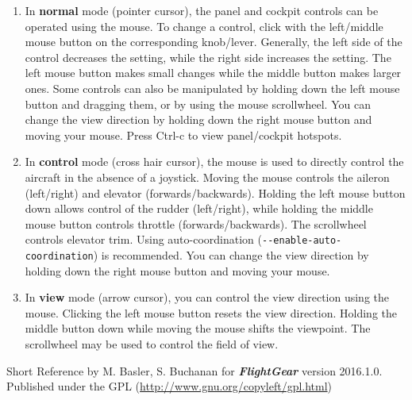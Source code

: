 \documentclass[10pt]{article}
\newcommand{\FlightGear}{{\itshape\bfseries FlightGear}}
\newcommand{\web}[1]{\href{#1}{#1}}
\begin{document}
 \begin{enumerate}
 \item In \textbf{normal} mode (pointer cursor), the panel and cockpit controls can be
 operated using the mouse. To change a control, click with the left/middle mouse button
 on the corresponding knob/lever. Generally, the left side of the control decreases the setting,
 while the right side increases the setting. The left mouse button makes small changes while the
 middle button makes larger ones. Some controls can also be manipulated by holding down the left
 mouse button and dragging them, or by using the mouse scrollwheel. You can change the view
 direction by holding down the right mouse button and moving your mouse.
 Press Ctrl-c to view panel/cockpit hotspots.

 \item In \textbf{control} mode (cross hair cursor), the mouse is used to directly control
 the aircraft in the absence of a joystick. Moving the mouse controls the aileron (left/right)
 and elevator (forwards/backwards). Holding the left mouse button down allows control of the rudder
 (left/right), while holding the middle mouse button controls throttle (forwards/backwards).
 The scrollwheel controls elevator trim. Using auto-coordination
 (\texttt{-$ $-enable-auto-coordination}) is recommended. You can change the view
 direction by holding down the right mouse button and moving your mouse.

 \item In \textbf{view} mode (arrow cursor), you can control the view direction using the mouse.
 Clicking the left mouse button resets the view direction. Holding the middle button down while
 moving the mouse shifts the viewpoint. The scrollwheel may be used to control the field of view.

\end{enumerate}

 \noindent
 Short Reference by M. Basler, S. Buchanan for \FlightGear{} version 2016.1.0.\\
 Published under the GPL (\web{http://www.gnu.org/copyleft/gpl.html})
\end{document}

